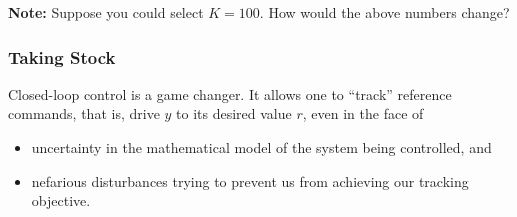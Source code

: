 \textbf{Note:} Suppose you could select $K=100$. How would the above numbers change? 

\subsubsection{Taking Stock}

Closed-loop control is a game changer. It allows one to  ``track'' reference commands, that is, drive $y$ to its desired value $r$, even in the face of
\begin{itemize}
    \item uncertainty in the mathematical model of the system being controlled, and
    \item nefarious disturbances trying to prevent us from achieving our tracking objective.
\end{itemize}

